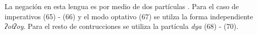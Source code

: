 La negación en esta lengua es por medio de dos partículas \textcolor{MidnightBlue}{\citep{Popoluca}}. Para el caso de imperativos (65) - (66) y el modo optativo (67) se utilza la forma independiente {\setmainfont{Charis SIL} \textit{ʔotʔoy}}. Para el resto de contrucciones se utiliza la partícula {\setmainfont{Charis SIL} \textit{dya}} (68) - (70).